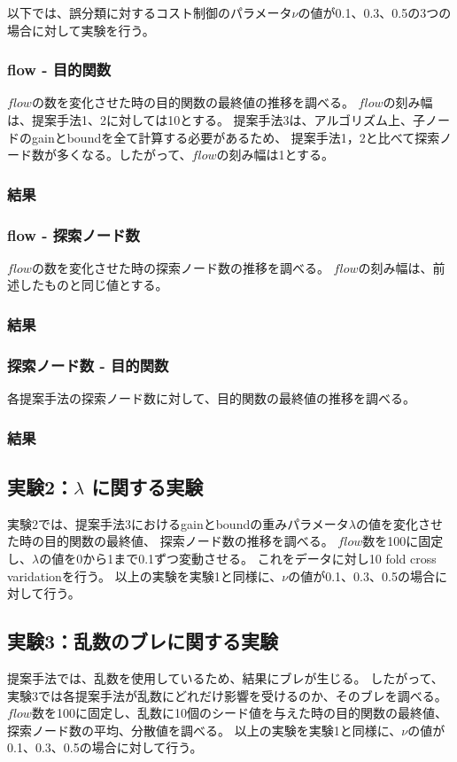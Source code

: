 以下では、誤分類に対するコスト制御のパラメータ$\nu$の値が0.1、0.3、0.5の3つの場合に対して実験を行う。

\subsubsection{flow - 目的関数}
$flow$の数を変化させた時の目的関数の最終値の推移を調べる。
$flow$の刻み幅は、提案手法1、2に対しては10とする。
提案手法3は、アルゴリズム上、子ノードのgainとboundを全て計算する必要があるため、
提案手法1，2と比べて探索ノード数が多くなる。したがって、$flow$の刻み幅は1とする。

\subsubsection{結果}

\subsubsection{flow - 探索ノード数}
$flow$の数を変化させた時の探索ノード数の推移を調べる。
$flow$の刻み幅は、前述したものと同じ値とする。

\subsubsection{結果}

\subsubsection{探索ノード数 - 目的関数}
各提案手法の探索ノード数に対して、目的関数の最終値の推移を調べる。

\subsubsection{結果}

\subsection{実験2：$\lambda$ に関する実験}
実験2では、提案手法3におけるgainとboundの重みパラメータ$\lambda$の値を変化させた時の目的関数の最終値、
探索ノード数の推移を調べる。
$flow$数を100に固定し、$\lambda$の値を0から1まで0.1ずつ変動させる。
これをデータに対し10 fold cross varidationを行う。 
以上の実験を実験1と同様に、$\nu$の値が0.1、0.3、0.5の場合に対して行う。

\subsection{実験3：乱数のブレに関する実験}
提案手法では、乱数を使用しているため、結果にブレが生じる。
したがって、実験3では各提案手法が乱数にどれだけ影響を受けるのか、そのブレを調べる。
$flow$数を100に固定し、乱数に10個のシード値を与えた時の目的関数の最終値、探索ノード数の平均、分散値を調べる。
以上の実験を実験1と同様に、$\nu$の値が0.1、0.3、0.5の場合に対して行う。

